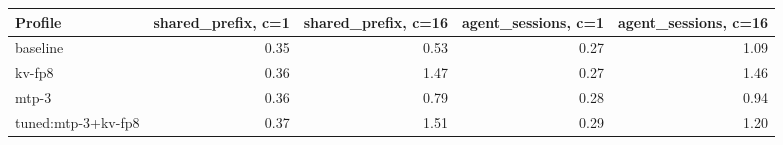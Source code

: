 \begin{tabular}{lrrrr}
\toprule
Profile & shared\_prefix, c=1 & shared\_prefix, c=16 & agent\_sessions, c=1 & agent\_sessions, c=16 \\
\midrule
baseline & 0.35 & 0.53 & 0.27 & 1.09 \\
kv-fp8 & 0.36 & 1.47 & 0.27 & 1.46 \\
mtp-3 & 0.36 & 0.79 & 0.28 & 0.94 \\
tuned:mtp-3+kv-fp8 & 0.37 & 1.51 & 0.29 & 1.20 \\
\bottomrule
\end{tabular}
